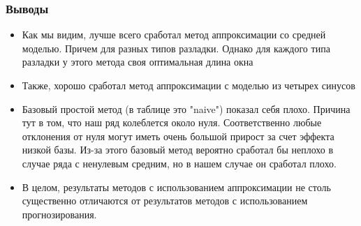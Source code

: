 \documentclass[intlimits, 9pt, unicode]{beamer}
\begin{document}
\begin{frame}
\frametitle{Выводы}

\begin{itemize}
	\item Как мы видим, лучше всего сработал метод аппроксимации со средней моделью. Причем для разных типов разладки. Однако для каждого типа разладки у этого метода своя оптимальная длина окна
	\item Также, хорошо сработал метод аппроксимации с моделью из четырех синусов
	\item Базовый простой метод (в таблице это "naive") показал себя плохо. Причина тут в том, что наш ряд колеблется около нуля. Соответственно любые отклонения от нуля могут иметь очень большой прирост за счет эффекта низкой базы. Из-за этого базовый метод вероятно сработал бы неплохо в случае ряда с ненулевым средним, но в нашем случае он сработал плохо.
	\item В целом, результаты методов с использованием аппроксимации не столь существенно отличаются от результатов методов с использованием прогнозирования.

\end{itemize}

\end{frame}
\end{document}
